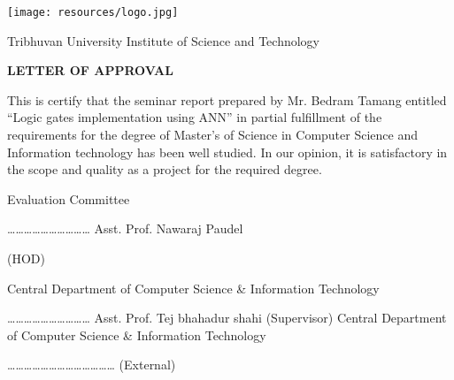 
\begin{center}
	\texttt{[image: resources/logo.jpg]}
\end{center}

\begin{center}
	Tribhuvan University
	\linebreak
	Institute of Science and Technology 
\end{center}


\begin{center}
	\vspace{2cm}
	\textbf{
		LETTER OF APPROVAL
	}
\end{center}



\vspace{2cm}
This is certify that the seminar report prepared by Mr. Bedram Tamang entitled “Logic gates implementation using ANN” in partial fulfillment of the requirements for the degree of Master's of Science in Computer Science and Information technology has been well studied. In our opinion, it is satisfactory in the scope and quality as a project for the required degree. 


\begin{center}
	Evaluation Committee
\end{center}

\begin{multicols}{2}
	\begin{flushleft}
		…………………………  \newline        
		Asst. Prof. Nawaraj Paudel
	\end{flushleft}
	(HOD)
	\begin{flushleft}	
		Central Department of Computer\newline
		Science \& Information Technology
	\end{flushleft}	
	\columnbreak
	\begin{flushleft}
		………………………… \newline
		Asst. Prof. Tej bhahadur shahi	
		(Supervisor) \newline	
		Central Department of Computer \newline           
		Science \& Information Technology        
	\end{flushleft}
\end{multicols}


\vspace{1cm}
\begin{flushleft}
	…………………………………\newline
	(External)
\end{flushleft}
\clearpage
